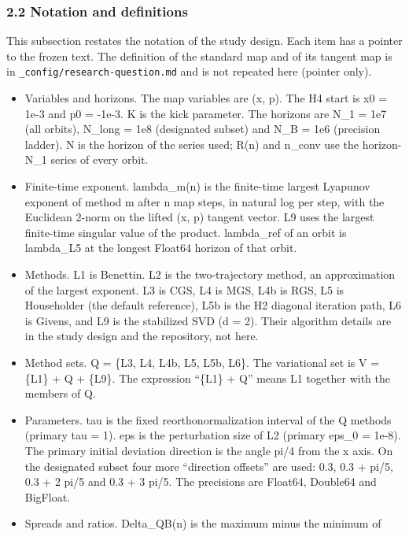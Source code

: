\documentclass[
  11pt,
]{article}
\providecommand{\tightlist}{%
  \setlength{\itemsep}{0pt}\setlength{\parskip}{0pt}}
\begin{document}
\subsubsection{2.2 Notation and
definitions}\label{notation-and-definitions}

This subsection restates the notation of the study design. Each item has
a pointer to the frozen text. The definition of the standard map and of
its tangent map is in \texttt{\_config/research-question.md} and is not
repeated here (pointer only).

\begin{itemize}
\tightlist
\item
  Variables and horizons. The map variables are (x, p). The H4 start is
  x0 = 1e-3 and p0 = -1e-3. K is the kick parameter. The horizons are
  N\_1 = 1e7 (all orbits), N\_long = 1e8 (designated subset) and N\_B =
  1e6 (precision ladder). N is the horizon of the series used; R(n) and
  n\_conv use the horizon-N\_1 series of every orbit.
\item
  Finite-time exponent. lambda\_m(n) is the finite-time largest Lyapunov
  exponent of method m after n map steps, in natural log per step, with
  the Euclidean 2-norm on the lifted (x, p) tangent vector. L9 uses the
  largest finite-time singular value of the product. lambda\_ref of an
  orbit is lambda\_L5 at the longest Float64 horizon of that orbit.
\item
  Methods. L1 is Benettin. L2 is the two-trajectory method, an
  approximation of the largest exponent. L3 is CGS, L4 is MGS, L4b is
  RGS, L5 is Householder (the default reference), L5b is the H2 diagonal
  iteration path, L6 is Givens, and L9 is the stabilized SVD (d = 2).
  Their algorithm details are in the study design and the repository,
  not here.
\item
  Method sets. Q = \{L3, L4, L4b, L5, L5b, L6\}. The variational set is
  V = \{L1\} + Q + \{L9\}. The expression ``\{L1\} + Q'' means L1
  together with the members of Q.
\item
  Parameters. tau is the fixed reorthonormalization interval of the Q
  methods (primary tau = 1). eps is the perturbation size of L2 (primary
  eps\_0 = 1e-8). The primary initial deviation direction is the angle
  pi/4 from the x axis. On the designated subset four more ``direction
  offsets'' are used: 0.3, 0.3 + pi/5, 0.3 + 2 pi/5 and 0.3 + 3 pi/5.
  The precisions are Float64, Double64 and BigFloat.
\item
  Spreads and ratios. Delta\_QB(n) is the maximum minus the minimum of

\end{itemize}
\end{document}
